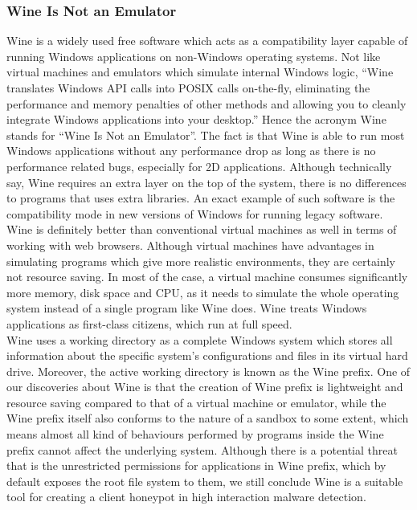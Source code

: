 \subsubsection{Wine Is Not an Emulator}
Wine is a widely used free software which acts as a compatibility layer 
capable of running Windows applications on non-Windows operating 
systems.\cite{wikiwine} Not like virtual machines and emulators which simulate 
internal Windows logic, ``Wine translates Windows API calls into POSIX calls 
on-the-fly, eliminating the performance and memory penalties of other methods 
and allowing you to cleanly integrate Windows applications into your 
desktop.''\cite{aboutwine} Hence the acronym Wine stands for ``Wine Is Not an 
Emulator''. The fact is that Wine is able to run most Windows applications 
without any performance drop as long as there is no performance related bugs, 
especially for 2D applications. Although technically say, Wine requires an 
extra layer on the top of the system, there is no differences to programs that 
uses extra libraries. An exact example of such software is the compatibility 
mode in new versions of Windows for running legacy 
software.\cite{wineperformance} \\
Wine is definitely better than conventional virtual machines as well in terms 
of working with web browsers. Although 
virtual machines have advantages in simulating programs which give more 
realistic environments, they are certainly not resource saving. In most of the 
case, a virtual machine consumes significantly more memory, disk space and 
CPU, as it needs to simulate the whole operating system instead of a single 
program like Wine does. Wine treats Windows applications as first-class 
citizens, which run at full speed.\cite{wineperformance} \\
Wine uses a working directory as a complete Windows system which stores all 
information about the specific system's configurations and files in its virtual 
hard drive. Moreover, the active working directory is known as the Wine prefix. 
One of our discoveries about Wine is that the creation of Wine prefix is 
lightweight and resource saving compared to that of a virtual machine or
emulator, while the Wine prefix itself also conforms to the nature of a 
sandbox to some extent, which means almost all kind of behaviours performed 
by programs inside the Wine prefix cannot affect the underlying system. 
Although there is a potential threat that is the unrestricted permissions 
for applications in Wine prefix, which by default exposes the root file 
system to them, we still conclude Wine is a suitable tool for creating a 
client honeypot in high interaction malware detection. \\

